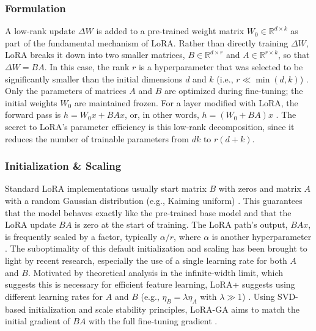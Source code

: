 \documentclass{DESSThesis}
\begin{document}
\subsubsection{Formulation}
A low-rank update $\Delta W$ is added to a pre-trained weight matrix $W_0 \in \mathbb{R}^{d \times k}$ as part of the fundamental mechanism of LoRA. Rather than directly training $\Delta W$, LoRA breaks it down into two smaller matrices, $B \in \mathbb{R}^{d \times r}$ and $A \in \mathbb{R}^{r \times k}$, so that $\Delta W = BA$. In this case, the rank $r$ is a hyperparameter that was selected to be significantly smaller than the initial dimensions $d$ and $k$ (i.e., $r \ll \min(d, k)$) \cite{hu_lora_2021,hayou_lora_2024}. Only the parameters of matrices $A$ and $B$ are optimized during fine-tuning; the initial weights $W_0$ are maintained frozen. For a layer modified with LoRA, the forward pass is $h = W_0 x + BAx$, or, in other words, $h = (W_0 + BA)x$ \cite{hu_lora_2021,hao_flora_2024}. The secret to LoRA's parameter efficiency is this low-rank decomposition, since it reduces the number of trainable parameters from $dk$ to $r(d+k)$.

\subsubsection{Initialization \& Scaling}
Standard LoRA implementations usually start matrix $B$ with zeros and matrix $A$ with a random Gaussian distribution (e.g., Kaiming uniform) \cite{hu_lora_2021,wang_lora-ga_2024}. This guarantees that the model behaves exactly like the pre-trained base model and that the LoRA update $BA$ is zero at the start of training. The LoRA path's output, $BAx$, is frequently scaled by a factor, typically $\alpha/r$, where $\alpha$ is another hyperparameter \cite{hu_lora_2021,biderman_lora_2024}. The suboptimality of this default initialization and scaling has been brought to light by recent research, especially the use of a single learning rate for both $A$ and $B$. Motivated by theoretical analysis in the infinite-width limit, which suggests this is necessary for efficient feature learning, LoRA+ suggests using different learning rates for $A$ and $B$ (e.g., $\eta_B = \lambda \eta_A$ with $\lambda \gg 1$) \cite{hayou_lora_2024}. Using SVD-based initialization and scale stability principles, LoRA-GA aims to match the initial gradient of $BA$ with the full fine-tuning gradient \cite{wang_lora-ga_2024}.
\end{document}
